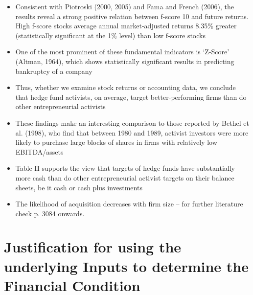 \documentclass[12pt]{article}
\begin{document}
\begin{itemize}
        \item Consistent with Piotroski (2000, 2005) and Fama and French (2006), the results reveal a strong positive relation between f-score 10 and future returns. High f-score stocks average annual market-adjusted returns 8.35\% greater (statistically significant at the 1\% level) than low f-score stocks \citep{Choi2012} 

       \item One of the most prominent of these fundamental indicators is ‘Z-Score’ (Altman, 1964), which shows statistically significant results in predicting bankruptcy of a company \citep{Mohr2012}

       \item Thus, whether we examine stock returns or accounting data, we conclude that hedge fund activists, on average, target better-performing firms than do other entrepreneurial activists \citep{Klein2009}

       \item These findings make an interesting comparison to those reported by Bethel et al. (1998), who find that between 1980 and 1989, activist investors were more likely to purchase large blocks of shares in firms with relatively low EBITDA/assets \citep{Klein2009}

       \item Table II supports the view that targets of hedge funds have substantially more cash than do other entrepreneurial activist targets on their balance sheets, be it cash or cash plus investments \citep{Klein2009}

       \item The likelihood of acquisition decreases with firm size \citep{Akhigbe2007} -- for further literature check p. 3084 onwards.
    \end{itemize}


\section{Justification for using the underlying Inputs to determine the Financial Condition}
\end{document}
